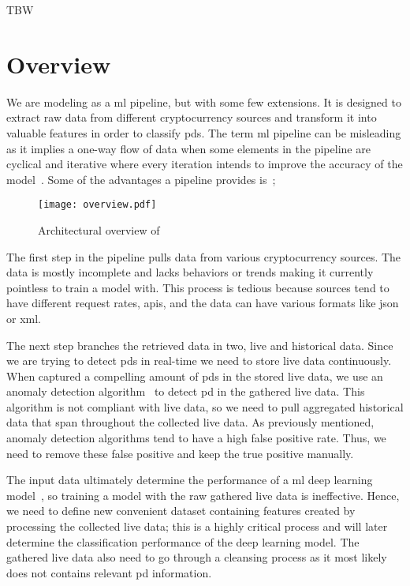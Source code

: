 TBW
\section{Overview}
We are modeling \project as a \ac{ml} pipeline, but with some few extensions. It is designed to extract raw data from different cryptocurrency sources and transform it into valuable features in order to classify \acp{pd}. The term \ac{ml} pipeline can be misleading as it implies a one-way flow of data when some elements in the pipeline are cyclical and iterative where every iteration intends to improve the accuracy of the model~\cite{ml_pipeline_3}. Some of the advantages a pipeline provides is~\cite{ml_pipeline_2};

\begin{figure}[ht]
    \centering
    \texttt{[image: overview.pdf]}
    \caption{Architectural overview of \project}
    \label{fig:overview}
\end{figure}

The first step in the pipeline pulls data from various cryptocurrency sources. The data is mostly incomplete and lacks behaviors or trends making it currently pointless to train a model with. This process is tedious because sources tend to have different request rates, \acp{api}, and the data can have various formats like \ac{json} or \ac{xml}.

The next step branches the retrieved data in two, live and historical data. Since we are trying to detect \acp{pd} in real-time we need to store live data continuously. When captured a compelling amount of \acp{pd} in the stored live data, we use an anomaly detection algorithm~\cite{P&D_to_the_moon} to detect \ac{pd} in the gathered live data. This algorithm is not compliant with live data, so we need to pull aggregated historical data that span throughout the collected live data. As previously mentioned, anomaly detection algorithms tend to have a high false positive rate. Thus, we need to remove these false positive and keep the true positive manually.

The input data ultimately determine the performance of a \ac{ml} deep learning model~\cite{mike_voets}, so training a model with the raw gathered live data is ineffective. Hence, we need to define new convenient dataset containing features created by processing the collected live data; this is a highly critical process and will later determine the classification performance of the deep learning model. The gathered live data also need to go through a cleansing process as it most likely does not contains relevant \ac{pd} information.

